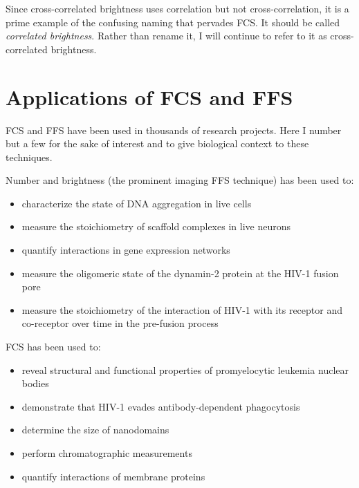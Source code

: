 \documentclass[12pt,]{book}
\providecommand{\tightlist}{%
  \setlength{\itemsep}{0pt}\setlength{\parskip}{0pt}}
\theoremstyle{definition}
\theoremstyle{definition}
\theoremstyle{definition}
\theoremstyle{remark}
\let\BeginKnitrBlock\begin \let\EndKnitrBlock\end
\begin{document}
\BeginKnitrBlock{remark}
\iffalse{} {Remark. } \fi{}Since cross-correlated brightness uses
correlation but not cross-correlation, it is a prime example of the
confusing naming that pervades FCS. It should be called \emph{correlated
brightness}. Rather than rename it, I will continue to refer to it as
cross-correlated brightness.
\EndKnitrBlock{remark}

\section{Applications of FCS and FFS}\label{applications-of-fcs-and-ffs}

FCS and FFS have been used in thousands of research projects. Here I
number but a few for the sake of interest and to give biological context
to these techniques.

Number and brightness (the prominent imaging FFS technique) has been
used to:

\begin{itemize}
\tightlist
\item
  characterize the state of DNA aggregation in live cells
  \citep{Mieruszynski}
\item
  measure the stoichiometry of scaffold complexes in live neurons
  \citep{Moutin}
\item
  quantify interactions in gene expression networks \citep{Declerck}
\item
  measure the oligomeric state of the dynamin-2 protein at the HIV-1
  fusion pore \citep{DanDynamin}
\item
  measure the stoichiometry of the interaction of HIV-1 with its
  receptor and co-receptor over time in the pre-fusion process
  \citep{HIVstoichiometry}
\end{itemize}

FCS has been used to:

\begin{itemize}
\tightlist
\item
  reveal structural and functional properties of promyelocytic leukemia
  nuclear bodies \citep{Hoischen}
\item
  demonstrate that HIV-1 evades antibody-dependent phagocytosis
  \citep{Gach}
\item
  determine the size of nanodomains \citep{Fenz}
\item
  perform chromatographic measurements \citep{Kisley}
\item
  quantify interactions of membrane proteins \citep{Ly}
\end{itemize}
\end{document}
